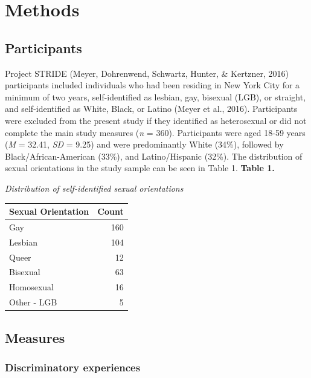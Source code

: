 \documentclass[
  english,
  man,floatsintext]{apa6}
\begin{document}
\hypertarget{methods}{%
\section{Methods}\label{methods}}

\hypertarget{participants}{%
\subsection{Participants}\label{participants}}

Project STRIDE (Meyer, Dohrenwend, Schwartz, Hunter, \& Kertzner, 2016) participants included individuals who had been residing in New York City for a minimum of two years, self-identified as lesbian, gay, bisexual (LGB), or straight, and self-identified as White, Black, or Latino (Meyer et al., 2016). Participants were excluded from the present study if they identified as heterosexual or did not complete the main study measures (\emph{n} = 360). Participants were aged 18-59 years (\emph{M} = 32.41, \emph{SD} = 9.25) and were predominantly White (34\%), followed by Black/African-American (33\%), and Latino/Hispanic (32\%). The distribution of sexual orientations in the study sample can be seen in Table 1.
\newpage
\textbf{Table 1.}

\emph{Distribution of self-identified sexual orientations}

\begin{tabular}{l|r}
\hline
Sexual Orientation & Count\\
\hline
Gay & 160\\
\hline
Lesbian & 104\\
\hline
Queer & 12\\
\hline
Bisexual & 63\\
\hline
Homosexual & 16\\
\hline
Other - LGB & 5\\
\hline
\end{tabular}

\hypertarget{measures}{%
\subsection{Measures}\label{measures}}

\hypertarget{discriminatory-experiences}{%
\subsubsection{Discriminatory experiences}\label{discriminatory-experiences}}
\end{document}
